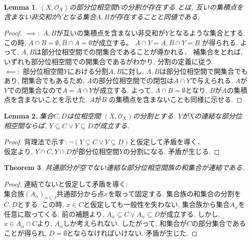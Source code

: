 \documentclass[lualatex]{ltjsbook}
\newcommand{\cl}[1]{\overline{ #1}  }
\newtheorem{theorem}{Theorem}[section]
\newtheorem{lemma}[theorem]{Lemma}
\theoremstyle{remark}
\theoremstyle{plain}
\begin{document}
\begin{lemma}
$(X, \mathcal{O}_X)$の部分位相空間$Y$の分割が存在する
とは, 互いの集積点を含まない非交和が$Y$となる集合$A,B$が存在することと同値である.
\end{lemma}

\begin{proof}
	$\implies:$ $A,B$が互いの集積点を含まない非交和が$Y$となるような集合とする. 
	この時, $ \cl{A} \cap B = \emptyset, \cl{B} \cap A = \emptyset$が成立する。
	$\cl{A} \cap Y = A, \cl{B} \cap Y = B$ が得られる.
	よって, $A,B$は部分位相空間での閉集合であることが導かれる．
	補集合をとれば, いずれも部分位相空間での開集合であるがわかり, 分割の定義に従う.\\
	$\impliedby:$ 部分位相空間$Y$における分割$A,B$に対し, $A,B$は部分位相空間で開集合でもあり, 
	閉集合でもあるため, $A$の部分位相空間での閉包は$\cl{A} \cap Y$で与えられる. 
	$A$が$Y$での閉集合なので$A = \cl{A} \cap Y$が成立する. 
	よって, $\cl{A} \cap B = \emptyset$となり, $B$が$A$の集積点を含まないことを示せた. 
	$A$が$B$ の集積点を含まないことも同様に示せる.
\end{proof}

\begin{lemma}
	集合$C,D$は位相空間 $(X,\mathcal{O}_X)$の分割とする. $Y$が$X$の連結な部分位相空間ならば, $Y \subseteq C \lor Y \subseteq D$が成立する.
\end{lemma}
 
\begin{proof}
	背理法で示す: $ \lnot (Y \subseteq C \lor Y \subseteq D)$と仮定して矛盾を導く．\\
	仮定より, $Y \cap C, Y\cap D$が部分位相空間$Y$の分割になる. 矛盾が生じる.
\end{proof}

\begin{theorem}
	共通部分が空でない連結な部分位相空間族の和集合が連結である.
\end{theorem}

\begin{proof}
	連結でないと仮定して矛盾を導く:\\
	集合族$\left( A_{\alpha} \right) _{\alpha \in J}$共通部分から点$x$を取って固定する.
	集合族の和集合の分割を$C,D$とする.
	この時, $x \in C$と仮定しても一般性を失わない, 集合族から集合$A_{\alpha}$を任意に取ってくる.
	前の補題より, $A_{\alpha} \subseteq C \lor A_{\alpha} \subseteq D$が成立する. 
	しかし, $x \in A_{\alpha} \cap C$より, $A_{\alpha}$しか考えられない. 
	したがって, 和集合が$C$の部分集合であることが得られ, $D = \emptyset$とならなければいけない. 
	矛盾が生じた.
\end{proof}
\end{document}
